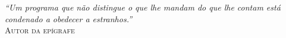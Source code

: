\textit{``Um programa que não distingue o que lhe mandam do que lhe contam
está condenado a obedecer a estranhos.''} \\
\vspace{0.5cm}
\textsc{Autor da epígrafe}
